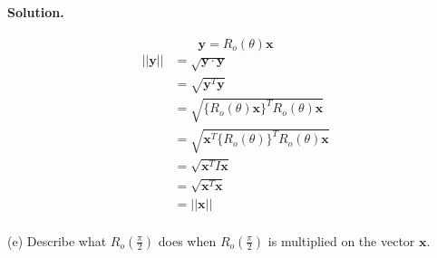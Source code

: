 \paragraph{Solution.}
$$\mathbf{y}=R_o(\theta)\mathbf{x}$$
\begin{align*}
    ||\mathbf{y}|| &= \sqrt{\mathbf{y}\cdot\mathbf{y}}\\
    &= \sqrt{\mathbf{y}^T\mathbf{y}}\\
    &= \sqrt{\{R_o(\theta)\mathbf{x}\}^TR_o(\theta)\mathbf{x}}\\
    &= \sqrt{\mathbf{x}^T\{R_o(\theta)\}^TR_o(\theta)\mathbf{x}}\\
    &= \sqrt{\mathbf{x}^TI\mathbf{x}}\\
    &= \sqrt{\mathbf{x}^T\mathbf{x}}\\
    &= ||\mathbf{x}||\\\tag*{$\qed$}
\end{align*}

(e) Describe what $R_o(\frac{\pi}{2})$ does when $R_o(\frac{\pi}{2})$ is multiplied on the vector $\mathbf{x}$.
